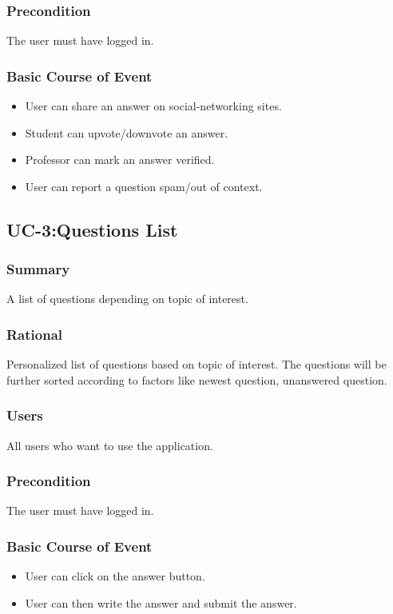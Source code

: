 \documentclass[12pt]{article}
\begin{document}
\subsubsection{Precondition}
The user must have logged in.
\subsubsection{Basic Course of Event}
\begin{itemize}
\item User can share an answer on social-networking sites.
\item Student can upvote/downvote an answer.
\item Professor can mark an answer verified.
\item User can report a question spam/out of context.
\end{itemize}

\subsection{UC-3:Questions List}
\subsubsection{Summary}
A list of questions depending on topic of interest.
\subsubsection{Rational}
Personalized list of questions based on topic of interest. The questions will be further sorted according to factors like newest question, unanswered question.
\subsubsection{Users}
All users who want to use the application.
\subsubsection{Precondition}
The user must have logged in.
\subsubsection{Basic Course of Event}
\begin{itemize}
\item User can click on the answer button.
\item User can then write the answer and submit the answer.
\end{itemize}
\end{document}
